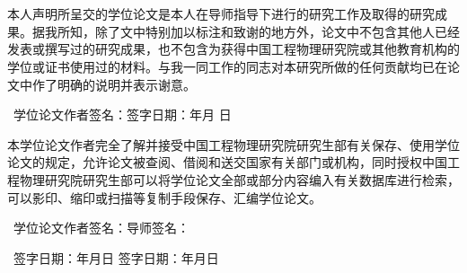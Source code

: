 
\chapter*{\bfseries\xiaosan{}}
\vspace{1em}

本人声明所呈交的学位论文是本人在导师指导下进行的研究工作及取得的研究成果。据我所知，除了文中特别加以标注和致谢的地方外，论文中不包含其他人已经发表或撰写过的研究成果，也不包含为获得中国工程物理研究院或其他教育机构的学位或证书使用过的材料。与我一同工作的同志对本研究所做的任何贡献均已在论文中作了明确的说明并表示谢意。

\vspace{2\baselineskip}
\noindent~学位论文作者签名：\hfill 签字日期：\hspace{2.5em}年\hspace{1.5em}月\hspace{1.5em} 日

\vspace{9\baselineskip}
\begin{center}\bfseries\xiaosan{}\end{center}
\vspace{1.5em}

本学位论文作者完全了解并接受中国工程物理研究院研究生部有关保存、使用学位论文的规定，允许论文被查阅、借阅和送交国家有关部门或机构，同时授权中国工程物理研究院研究生部可以将学位论文全部或部分内容编入有关数据库进行检索，可以影印、缩印或扫描等复制手段保存、汇编学位论文。

\vspace{2\baselineskip}
\noindent~学位论文作者签名：\hfill 导师签名：\hspace{8.5em}

\vspace{1\baselineskip}
\noindent~签字日期：\hspace{2.5em}年\hspace{1.5em}月\hspace{1.5em}日 \hfill 签字日期：\hspace{2.5em}年\hspace{1.5em}月\hspace{1.5em}日

\thispagestyle{empty}
    \newpage
    ~~~\vspace{1em}
    \thispagestyle{empty}